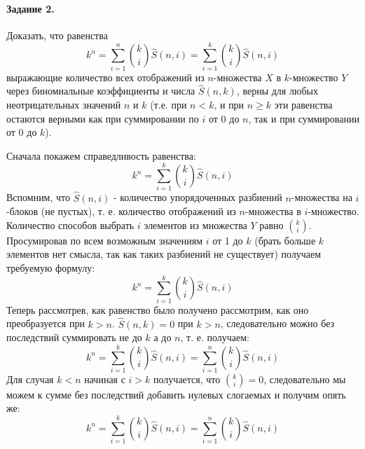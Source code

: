 \documentclass[a4paper,12pt]{article}
\begin{document}
\paragraph{Задание 2.} Доказать, что равенства
\[
	k^n=\sum_{i=1}^n \binom{k}{i} \hat S \left(n,i\right) = \sum_{i=1}^k \binom{k}{i} \hat S \left(n,i\right)
\]
выражающие количество всех отображений из $n$-множества $X$ в $k$-множество $Y$ через биномиальные коэффициенты и числа $\hat S \left(n,k\right)$, верны для любых неотрицательных значений $n$ и $k$ (т.е. при $n<k$, и при $n\ge k$ эти равенства остаются верными как при суммировании по $i$ от 0 до $n$, так и при суммировании от 0 до $k$).

\begin{Proof}
Сначала покажем справедливость равенства:
\[
	k^n = \sum_{i=1}^k \binom{k}{i} \hat S \left(n,i\right)
\]
Вспомним, что $\hat S \left(n,i\right)$ - количество упорядоченных разбиений $n$-множества на $i$-блоков (не пустых), т. е. количество отображений из $n$-множества в $i$-множество. Количество способов выбрать $i$ элементов из множества $Y$ равно $\binom{k}{i}$. Просумировав по всем возможным значениям $i$ от 1 до $k$ (брать больше $k$ элементов нет смысла, так как таких разбиений не существует) получаем требуемую формулу:
\[
	k^n = \sum_{i=1}^k \binom{k}{i} \hat S \left(n,i\right)
\]
Теперь рассмотрев, как равенство было получено рассмотрим, как оно преобразуется при $k>n$. $\hat S \left(n,k\right) = 0$ при $k>n$, следовательно можно без последствий суммировать не до $k$ а до $n$, т. е. получаем:
\[
	k^n = \sum_{i=1}^k \binom{k}{i} \hat S \left(n,i\right) = \sum_{i=1}^n \binom{k}{i} \hat S \left(n,i\right)
\]
Для случая $k < n$ начиная с $i > k$ получается, что $\binom{k}{i} = 0$, следовательно мы можем к сумме без последствий добавить нулевых слогаемых и получим опять же:
\[
	k^n = \sum_{i=1}^k \binom{k}{i} \hat S \left(n,i\right) = \sum_{i=1}^n \binom{k}{i} \hat S \left(n,i\right)
\]
\end{Proof}
\end{document}
